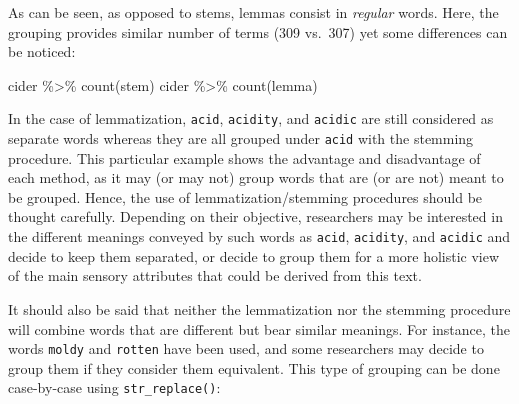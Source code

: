 \documentclass[
]{book}
\newenvironment{Shaded}{\begin{snugshade}}{\end{snugshade}}
\newcommand{\AttributeTok}[1]{\textcolor[rgb]{0.77,0.63,0.00}{#1}}
\newcommand{\ConstantTok}[1]{\textcolor[rgb]{0.00,0.00,0.00}{#1}}
\newcommand{\FunctionTok}[1]{\textcolor[rgb]{0.00,0.00,0.00}{#1}}
\newcommand{\NormalTok}[1]{#1}
\newcommand{\OtherTok}[1]{\textcolor[rgb]{0.56,0.35,0.01}{#1}}
\newcommand{\SpecialCharTok}[1]{\textcolor[rgb]{0.00,0.00,0.00}{#1}}
\newcommand{\StringTok}[1]{\textcolor[rgb]{0.31,0.60,0.02}{#1}}
\begin{document}
\begin{Shaded}
\end{Shaded}

As can be seen, as opposed to stems, lemmas consist in \emph{regular} words. Here, the grouping provides similar number of terms (309 vs.~307) yet some differences can be noticed:

\begin{Shaded}
\begin{Highlighting}[]
\NormalTok{cider }\SpecialCharTok{\%\textgreater{}\%} \FunctionTok{count}\NormalTok{(stem)}
\NormalTok{cider }\SpecialCharTok{\%\textgreater{}\%} \FunctionTok{count}\NormalTok{(lemma)}
\end{Highlighting}
\end{Shaded}

In the case of lemmatization, \texttt{acid}, \texttt{acidity}, and \texttt{acidic} are still considered as separate words whereas they are all grouped under \texttt{acid} with the stemming procedure. This particular example shows the advantage and disadvantage of each method, as it may (or may not) group words that are (or are not) meant to be grouped. Hence, the use of lemmatization/stemming procedures should be thought carefully. Depending on their objective, researchers may be interested in the different meanings conveyed by such words as \texttt{acid}, \texttt{acidity}, and \texttt{acidic} and decide to keep them separated, or decide to group them for a more holistic view of the main sensory attributes that could be derived from this text.

It should also be said that neither the lemmatization nor the stemming procedure will combine words that are different but bear similar meanings. For instance, the words \texttt{moldy} and \texttt{rotten} have been used, and some researchers may decide to group them if they consider them equivalent. This type of grouping can be done case-by-case using \texttt{str\_replace()}:
\end{document}
